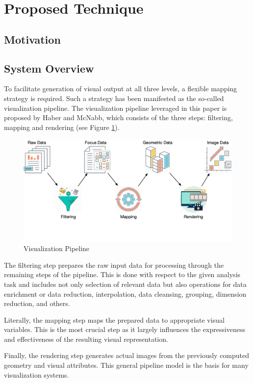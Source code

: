 \documentclass[10pt, conference, compsocconf]{IEEEtran}
\begin{document}
\section{Proposed Technique}

\subsection{Motivation}

\subsection{System Overview}

To facilitate generation of visual output at all three levels, a flexible mapping strategy is required. Such a strategy has been manifested as the so-called visualization pipeline. The visualization pipeline leveraged in this paper is proposed by Haber and McNabb\cite{dosSantos:2004ck}, which consists of the three steps: filtering, mapping and rendering (see Figure \ref{fig:pipeline}).

\begin{figure}
    \centering
    \includegraphics[width=.45\textwidth]{images/pipeline.png}
    \caption{Visualization Pipeline}
    \label{fig:pipeline}
\end{figure}

The filtering step prepares the raw input data for processing through the remaining steps of the pipeline. This is done with respect to the given analysis task and includes not only selection of relevant data but also operations for data enrichment or data reduction, interpolation, data cleansing, grouping, dimension reduction, and others. 

Literally, the mapping step maps the prepared data to appropriate visual variables. This is the most crucial step as it largely influences the expressiveness and effectiveness of the resulting visual representation. 

Finally, the rendering step generates actual images from the previously computed geometry and visual attributes. This general pipeline model is the basis for many visualization systems.
\end{document}
